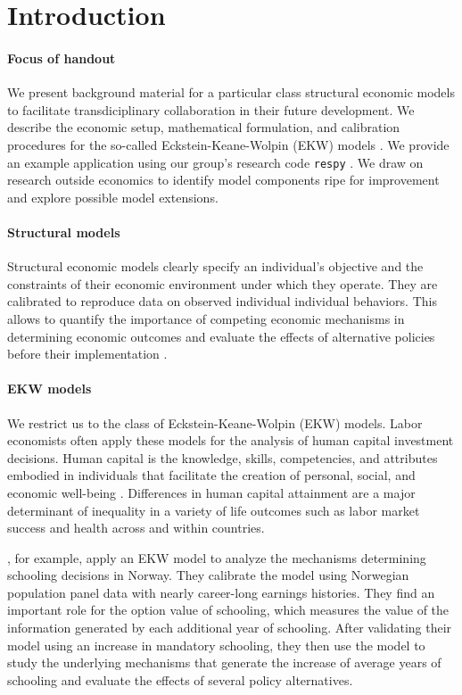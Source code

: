 \section{Introduction}
\paragraph{Focus of handout} We present background material for a particular class structural economic models to facilitate transdiciplinary collaboration in their future development. We describe the economic setup, mathematical formulation, and calibration procedures for the so-called Eckstein-Keane-Wolpin (EKW) models \citep{Aguirregabiria.2010}. We provide an example application using our group's research code \verb+respy+ \citep{respy-1.0}. We draw on research outside economics to identify model components ripe for improvement and explore possible model extensions.

\paragraph{Structural models}  Structural economic models clearly specify an individual's objective and the constraints of their economic environment under which they operate. They are calibrated to reproduce data on observed individual individual behaviors. This allows to quantify the importance of competing economic mechanisms in determining economic outcomes and evaluate the effects of alternative policies before their implementation \citep{Wolpin.2013}.

\paragraph{EKW models} We restrict us to the class of Eckstein-Keane-Wolpin (EKW) models. Labor economists often apply these models for the analysis of human capital investment decisions. Human capital is the knowledge, skills, competencies, and attributes embodied in individuals that facilitate the creation of personal, social, and economic well-being \citep{OECD.2001}. Differences in human capital attainment are a major determinant of inequality in a variety of life outcomes such as labor market success and health across and within countries.

\citet{Bhuller.2018}, for example, apply an EKW model to analyze the mechanisms determining schooling decisions in Norway. They calibrate the model using Norwegian population panel data with nearly career-long earnings histories. They find an important role for the option value of schooling, which measures the value of the information generated by each additional year of schooling. After validating their model using an increase in mandatory schooling, they then use the model to study the underlying mechanisms that generate the increase of average years of schooling and evaluate the effects of several policy alternatives.

